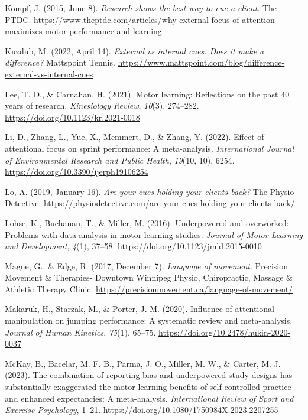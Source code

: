 \documentclass[
  man, donotrepeattitle,floatsintext]{apa7}
\newlength{\cslhangindent}
\newlength{\cslentryspacingunit} %
\newenvironment{CSLReferences}[2] %
 {%
  \setlength{\parindent}{0pt}
  \ifodd #1
  \let\oldpar\par
  \def\par{\hangindent=\cslhangindent\oldpar}
  \fi
  \setlength{\parskip}{#2\cslentryspacingunit}
 }%
 {}
\begin{document}
\begin{CSLReferences}{1}{0}
\leavevmode{}%
Kompf, J. (2015, June 8). \emph{Research shows the best way to cue a client}. {The PTDC}. \url{https://www.theptdc.com/articles/why-external-focus-of-attention-maximizes-motor-performance-and-learning}

\leavevmode{}%
Kuzdub, M. (2022, April 14). \emph{External vs internal cues: {Does} it make a difference?} {Mattspoint Tennis}. \url{https://www.mattspoint.com/blog/difference-external-vs-internal-cues}

\leavevmode{}%
Lee, T. D., \& Carnahan, H. (2021). Motor learning: {Reflections} on the past 40 years of research. \emph{Kinesiology Review}, \emph{10}(3), 274--282. \url{https://doi.org/10.1123/kr.2021-0018}

\leavevmode{}%
Li, D., Zhang, L., Yue, X., Memmert, D., \& Zhang, Y. (2022). Effect of attentional focus on sprint performance: {A} meta-analysis. \emph{International Journal of Environmental Research and Public Health}, \emph{19}(10, 10), 6254. \url{https://doi.org/10.3390/ijerph19106254}

\leavevmode{}%
Lo, A. (2019, January 16). \emph{Are your cues holding your clients back?} {The Physio Detective}. \url{https://physiodetective.com/are-your-cues-holding-your-clients-back/}

\leavevmode{}%
Lohse, K., Buchanan, T., \& Miller, M. (2016). Underpowered and overworked: {Problems} with data analysis in motor learning studies. \emph{Journal of Motor Learning and Development}, \emph{4}(1), 37--58. \url{https://doi.org/10.1123/jmld.2015-0010}

\leavevmode{}%
Magne, G., \& Edge, R. (2017, December 7). \emph{Language of movement}. {Precision Movement \& Therapies- Downtown Winnipeg Physio, Chiropractic, Massage \& Athletic Therapy Clinic}. \url{https://precisionmovement.ca/language-of-movement/}

\leavevmode{}%
Makaruk, H., Starzak, M., \& Porter, J. M. (2020). Influence of attentional manipulation on jumping performance: {A} systematic review and meta-analysis. \emph{Journal of Human Kinetics}, \emph{75}(1), 65--75. \url{https://doi.org/10.2478/hukin-2020-0037}

\leavevmode{}%
McKay, B., Bacelar, M. F. B., Parma, J. O., Miller, M. W., \& Carter, M. J. (2023). The combination of reporting bias and underpowered study designs has substantially exaggerated the motor learning benefits of self-controlled practice and enhanced expectancies: A meta-analysis. \emph{International Review of Sport and Exercise Psychology}, 1--21. \url{https://doi.org/10.1080/1750984X.2023.2207255}


\end{CSLReferences}
\end{document}
